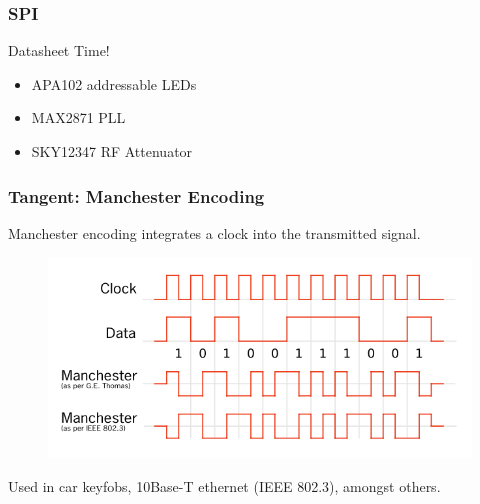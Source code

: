 \documentclass[t]{beamer}
\begin{document}
\begin{frame}[t]
\frametitle{SPI}
Datasheet Time!
\begin{itemize}
	\item APA102 addressable LEDs
	\item MAX2871 PLL 
	\item SKY12347 RF Attenuator 
\end{itemize}

\end{frame}


\begin{frame}[t]
\frametitle{Tangent: Manchester Encoding}
Manchester encoding integrates a clock into the transmitted signal. \\
\begin{figure}
	\includegraphics[width=0.9\linewidth]{manchester.png}
\end{figure}
Used in car keyfobs, 10Base-T ethernet (IEEE 802.3), amongst others. 
\end{frame}

\end{document}

